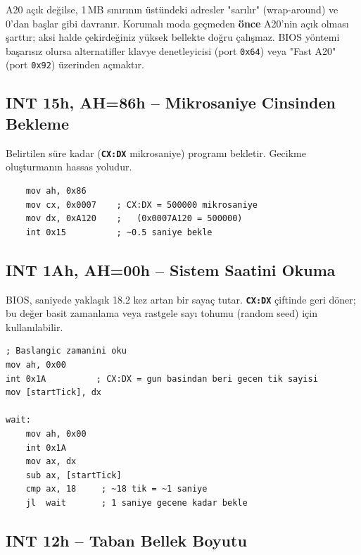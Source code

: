 \documentclass[11pt,a4paper]{article}
\newcommand{\reg}[1]{\texttt{\color{anaMavi}\textbf{#1}}}
\newcommand{\hx}[1]{\texttt{\color{turuncu}#1}}
\begin{document}
\begin{bilgikutu}
A20 açık değilse, 1\,MB sınırının üstündeki adresler "sarılır" (wrap-around) ve
0'dan başlar gibi davranır. Korumalı moda geçmeden \textbf{önce} A20'nin açık
olması şarttır; aksi halde çekirdeğiniz yüksek bellekte doğru çalışmaz. BIOS
yöntemi başarısız olursa alternatifler klavye denetleyicisi (port \hx{0x64})
veya "Fast A20" (port \hx{0x92}) üzerinden açmaktır.
\end{bilgikutu}

\subsection{INT 15h, AH=86h -- Mikrosaniye Cinsinden Bekleme}

Belirtilen süre kadar (\reg{CX:DX} mikrosaniye) programı bekletir. Gecikme
oluşturmanın hassas yoludur.

\begin{ornekkutu}
\begin{lstlisting}
    mov ah, 0x86
    mov cx, 0x0007    ; CX:DX = 500000 mikrosaniye
    mov dx, 0xA120    ;   (0x0007A120 = 500000)
    int 0x15          ; ~0.5 saniye bekle
\end{lstlisting}
\end{ornekkutu}

\subsection{INT 1Ah, AH=00h -- Sistem Saatini Okuma}

BIOS, saniyede yaklaşık 18.2 kez artan bir sayaç tutar. \reg{CX:DX} çiftinde
geri döner; bu değer basit zamanlama veya rastgele sayı tohumu (random seed)
için kullanılabilir.

\begin{ornekkutu}
\begin{lstlisting}
; Baslangic zamanini oku
mov ah, 0x00
int 0x1A          ; CX:DX = gun basindan beri gecen tik sayisi
mov [startTick], dx

wait:
    mov ah, 0x00
    int 0x1A
    mov ax, dx
    sub ax, [startTick]
    cmp ax, 18     ; ~18 tik = ~1 saniye
    jl  wait       ; 1 saniye gecene kadar bekle
\end{lstlisting}
\end{ornekkutu}

\subsection{INT 12h -- Taban Bellek Boyutu}
\end{document}
